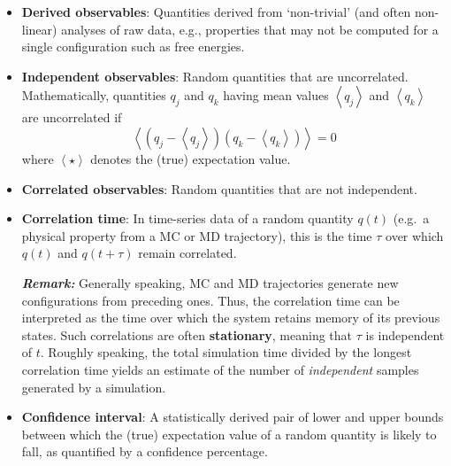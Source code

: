 \begin{itemize}
\item {\bf Derived observables}: Quantities derived from `non-trivial' (and often non-linear) analyses of raw data, e.g., properties that may not be computed for a single configuration such as free energies.
  

\item {\bf Independent observables}:  Random quantities that are uncorrelated.
Mathematically, quantities $q_j$ and $q_k$ having mean values $\left< q_j \right> $ and $\left< q_k \right>$ are uncorrelated if
% 
\begin{equation}
  \left< \left(q_j - \left<q_j\right> \right) \left(q_k - \left<q_k\right> \right) \right>=0
\end{equation}
%
where $\left< \star \right>$ denotes the (true) expectation value.

\item {\bf Correlated observables}: Random quantities that are not independent.

\item {\bf Correlation time}: In time-series data of a random quantity $q(t)$ (e.g.\ a physical property from a MC or MD trajectory), this is the time $\tau$ over which $q(t)$ and $q(t+\tau)$ remain correlated.

\smallskip

\textbf{\textit{Remark:}} Generally speaking, MC and MD trajectories generate new configurations from preceding ones.
Thus, the correlation time can be interpreted as the time over which the system retains memory of its previous states.
Such correlations are often {\bf stationary}, meaning that $\tau$ is independent of $t$.
Roughly speaking, the total simulation time divided by the longest correlation time yields an estimate of the number of {\it independent} samples generated by a simulation.



\item {\bf Confidence interval}: A statistically derived pair of lower and upper bounds between which the (true) expectation value of a random quantity is likely to fall, as quantified by a confidence percentage.


\end{itemize}
